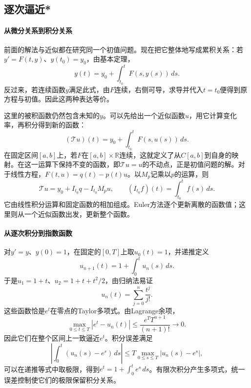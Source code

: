 \subsection{逐次逼近*}
\label{subsec:calculus-successive-approximations}
\begingroup
\setlength{\parskip}{3pt}
\setlength{\abovedisplayskip}{8pt}
\setlength{\belowdisplayskip}{8pt}

\paragraph{从微分关系到积分关系} \mbox{}

前面的解法与近似都在研究同一个初值问题。现在把它整体地写成累积关系：若\(y'=F(t,y)\)、\(y(t_0)=y_0\)，由基本定理，
\begin{equation}\label{eq:calculus-ode-integral-equation}
 y(t)=y_0+\int_{t_0}^t F(s,y(s))\,ds.
\end{equation}
反过来，若连续函数\(y\)满足此式，由\(F\)连续，右侧可导，求导并代入\(t=t_0\)便得到原方程与初值。因此这两种表达等价。

这里的被积函数仍然包含未知的\(y\)。可以先给出一个近似函数\(u\)，用它计算变化率，再积分得到新的函数：
\begin{equation*}
 (\mathcal Tu)(t)=y_0+\int_{t_0}^t F(s,u(s))\,ds.
\end{equation*}
在固定区间\([a,b]\)上，若\(F\)在\([a,b]\times\mathbb R\)连续，这就定义了从\(C[a,b]\)到自身的映射。在这一运算下保持不变的函数，即\(\mathcal Tu=u\)的{\heiti{}不动点}，正是初值问题的解。对于线性方程，\(F(t,u)=q(t)-p(t)u\)。以\(M_p\)记乘以\(p\)的运算，则
\begin{equation*}
 \mathcal Tu=y_0+I_{t_0}q-I_{t_0}M_pu,
 \qquad (I_{t_0}f)(t)=\int_{t_0}^t f(s)\,ds.
\end{equation*}
它由线性积分运算和固定函数的相加组成。Euler方法逐个更新离散的函数值；这里则从一个近似函数出发，更新整个函数。

\paragraph{从逐次积分到指数函数} \mbox{}

对\(y'=y\)、\(y(0)=1\)，在固定的\([0,T]\)上取\(u_0(t)=1\)，并递推定义
\begin{equation*}
 u_{n+1}(t)=1+\int_0^t u_n(s)\,ds.
\end{equation*}
于是\(u_1=1+t\)、\(u_2=1+t+t^2/2\)，由归纳法易证
\begin{equation*}
 u_n(t)=\sum_{j=0}^n\frac{t^j}{j!}.
\end{equation*}
这些函数恰是\(e^t\)在零点的Taylor多项式。由Lagrange余项，
\begin{equation*}
 \max_{0\le t\le T}|e^t-u_n(t)|\le\frac{e^TT^{n+1}}{(n+1)!}\longrightarrow0.
\end{equation*}
因此它们在整个区间上一致逼近\(e^t\)。积分误差满足
\begin{equation*}
 \left|\int_0^t(u_n(s)-e^s)\,ds\right|
 \le T\max_{0\le s\le T}|u_n(s)-e^s|,
\end{equation*}
可以在递推等式中取极限，得到\(e^t=1+\int_0^t e^s\,ds\)。有限次积分产生多项式，统一误差控制使它们的极限保留积分关系。

